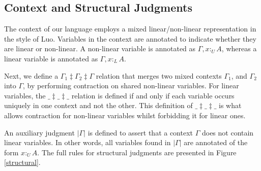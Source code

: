 \documentclass{article}
\theoremstyle{definition}
\newcommand{\pure}[1]{|#1|}
\newcommand{\utype}{:_U}
\newcommand{\ltype}{:_L}
\newcommand{\mrg}[3]{#1\ddagger#2\ddagger#3}
\begin{document}
  \subsection{Context and Structural Judgments}
  The context of our language employs a mixed linear/non-linear representation in the style of Luo\cite{luo}. Variables in the context are annotated to indicate whether they are linear or non-linear. A non-linear variable is annotated as $\Gamma, x \utype A$, whereas a linear variable is annotated as $\Gamma, x \ltype A$. 
  
  Next, we define a $\mrg{\Gamma_1}{\Gamma_2}{\Gamma}$ relation that merges two mixed contexts $\Gamma_1$, and $\Gamma_2$ into $\Gamma$, by performing contraction on shared non-linear variables. For linear variables, the $\mrg{\_}{\_}{\_}$ relation is defined if and only if each variable occurs uniquely in one context and not the other. This definition of $\mrg{\_}{\_}{\_}$ is what allows contraction for non-linear variables whilst forbidding it for linear ones.

  An auxiliary judgment $\pure{\Gamma}$ is defined to assert that a context $\Gamma$ does not contain linear variables. In other words, all variables found in $\pure{\Gamma}$ are annotated of the form $x \utype A$. The full rules for structural judgments are presented in Figure \ref{structural}.
  
\end{document}
